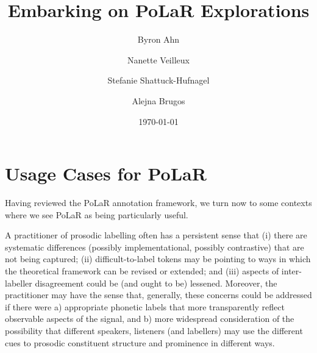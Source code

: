 \documentclass[11pt, twoside]{memoir}
\def\THIStitle{Embarking on PoLaR Explorations}
\def\THISsubtitle{A Framework for Intonational Annotation and Analysis}
\begin{document}
\frontmatter
{}

\title{\THIStitle}
\author{Byron Ahn \and Nanette Veilleux \and Stefanie Shattuck-Hufnagel \and Alejna Brugos}
\date{\today}


\tableofcontents
\newpage
\listoffigures
\listoftables
\newpage

\mainmatter
\chapter{Usage Cases for PoLaR}\label{ch:advantages}

Having reviewed the PoLaR annotation framework, we turn now to some contexts where we see PoLaR as being particularly useful.

A practitioner of prosodic labelling often has a persistent sense that (i) there are systematic differences (possibly implementational, possibly contrastive) that are not being captured; (ii) difficult-to-label tokens may be pointing to ways in which the theoretical framework can be revised or extended; and (iii) aspects of inter-labeller disagreement could be (and ought to be) lessened. Moreover, the practitioner may have the sense that, generally, these concerns could be addressed if there were a) appropriate phonetic labels that more transparently reflect observable aspects of the signal, and b) more widespread consideration of the possibility that different speakers, listeners (and labellers) may use the different cues to prosodic constituent structure and prominence in different ways.
\end{document}
